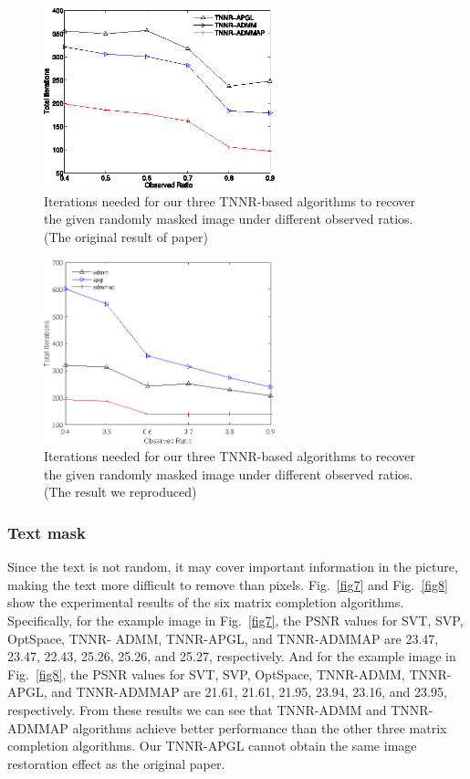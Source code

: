 \documentclass{article}
\begin{document}
{\begin{figure}[htbp]
	\centering
	\includegraphics[width=0.6\textwidth]{./assets/ori-fig6.eps}
	\caption{Iterations needed for our three TNNR-based algorithms to recover the given
		randomly masked image under different observed ratios. (The original result of paper)}
	\label{fig6ori}
\end{figure}
\begin{figure}[htbp]
	\centering
	\includegraphics[width=0.6\textwidth]{./assets/fig6.eps}
	\caption{Iterations needed for our three TNNR-based algorithms to recover the given
		randomly masked image under different observed ratios. (The result we reproduced)}
	\label{fig6}
\end{figure}

\subsubsection{Text mask}
\label{text}

Since the text is not random, it may cover important information in the picture, making the text more difficult to remove than pixels. Fig.~\ref{fig7} and Fig.~\ref{fig8} show the experimental results of the six matrix
completion algorithms. Specifically, for the example image
in Fig.~\ref{fig7}, the PSNR values for SVT, SVP, OptSpace, TNNR-
ADMM, TNNR-APGL, and TNNR-ADMMAP are 23.47,
23.47, 22.43, 25.26, 25.26, and 25.27, respectively. And for the
example image in Fig.~\ref{fig8}, the PSNR values for SVT, SVP,
OptSpace, TNNR-ADMM, TNNR-APGL, and TNNR-ADMMAP are 21.61, 21.61, 21.95, 23.94, 23.16, and 23.95, respectively. 
From these results we can see that TNNR-ADMM and TNNR-ADMMAP algorithms achieve better performance than the other three matrix completion algorithms. Our TNNR-APGL cannot obtain the same image restoration effect as the original paper.

}
\end{document}
